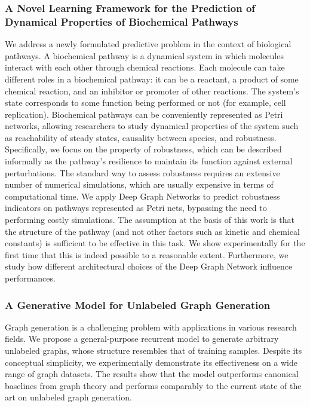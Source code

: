 \subsubsection*{A Novel Learning Framework for the Prediction of Dynamical Properties of Biochemical Pathways}
We address a newly formulated predictive problem in the context of biological pathways. A biochemical pathway is a dynamical system in which molecules interact with each other through chemical reactions. Each molecule can take different roles in a biochemical pathway: it can be a reactant, a product of some chemical reaction, and an inhibitor or promoter of other reactions. The system's state corresponds to some function being performed or not (for example, cell replication). Biochemical pathways can be conveniently represented as Petri networks, allowing researchers to study dynamical properties of the system such as reachability of steady states, causality between species, and robustness. Specifically, we focus on the property of robustness, which can be described informally as the pathway's resilience to maintain its function against external perturbations. The standard way to assess robustness requires an extensive number of numerical simulations, which are usually expensive in terms of computational time. We apply Deep Graph Networks to predict robustness indicators on pathways represented as Petri nets, bypassing the need to performing costly simulations. The assumption at the basis of this work is that the structure of the pathway (and not other factors such as kinetic and chemical constants) is sufficient to be effective in this task. We show experimentally for the first time that this is indeed possible to a reasonable extent. Furthermore, we study how different architectural choices of the Deep Graph Network influence performances.

\subsubsection*{A Generative Model for Unlabeled Graph Generation}
Graph generation is a challenging problem with applications in various research fields. We propose a general-purpose recurrent model to generate arbitrary unlabeled graphs, whose structure resembles that of training samples. Despite its conceptual simplicity, we experimentally demonstrate its effectiveness on a wide range of graph datasets. The results show that the model outperforms canonical baselines from graph theory and performs comparably to the current state of the art on unlabeled graph generation.

